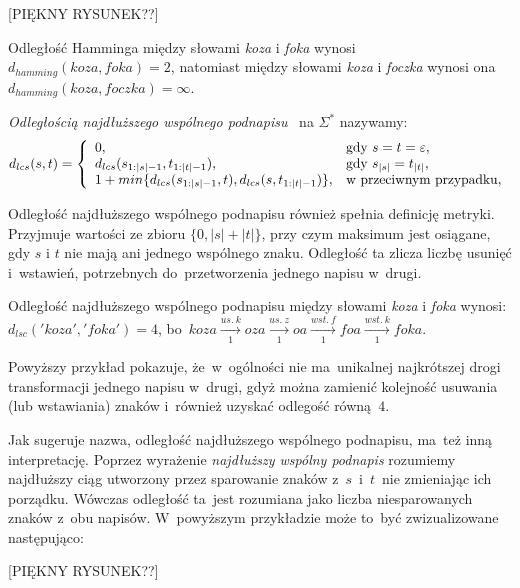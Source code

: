 \documentclass{praca1}
\begin{document}
[PIĘKNY RYSUNEK??]

\begin{example}
Odległość Hamminga między słowami \emph{koza} i \emph{foka} wynosi $d_{hamming}(koza, foka) = 2$, natomiast między słowami \emph{koza} i \emph{foczka} wynosi ona $d_{hamming}(koza, foczka) = \infty$.
\end{example}

\begin{definition}
\emph{Odległością najdłuższego wspólnego podnapisu}~\cite{Needleman2008:generalmethod} na $\Sigma^*$ nazywamy:
$$
d_{lcs}(s, t) = \left\{
\begin{array}{l l}     
    0, & \text{gdy } s = t = \varepsilon,\\
    d_{lcs}(s_{1:|s|-1}, t_{1:|t|-1}), & \text{gdy } s_{|s|} = t_{|t|}, \\
    1+min\{d_{lcs}(s_{1:|s|-1}, t), d_{lcs}(s, t_{1:|t|-1})\}, & \text{w przeciwnym przypadku},
\end{array}\right.
$$
\end{definition}

Odległość najdłuższego wspólnego podnapisu również spełnia definicję metryki. Przyjmuje wartości ze zbioru $\{0, |s|+|t|\}$, przy czym maksimum jest osiągane, gdy $s$ i $t$ nie mają ani jednego wspólnego znaku.
Odległość ta zlicza liczbę usunięć i~wstawień, potrzebnych do~przetworzenia jednego napisu w~drugi. 

\begin{example}
Odległość najdłuższego wspólnego podnapisu między słowami \emph{koza} i \emph{foka} wynosi: $d_{lsc}('koza', 'foka') = 4$, bo~$koza  \xrightarrow[1]{us.\ k} oza \xrightarrow[1]{us.\ z} oa  \xrightarrow[1]{wst.\ f} foa \xrightarrow[1]{wst.\ k} foka$.
\end{example}

Powyższy przykład pokazuje, że~w~ogólności nie ma~unikalnej najkrótszej drogi transformacji jednego napisu w~drugi, gdyż można zamienić kolejność usuwania (lub wstawiania) znaków i~również uzyskać odlegość równą~$4$.

Jak sugeruje nazwa, odległość najdłuższego wspólnego podnapisu, ma~też inną interpretację. Poprzez wyrażenie \emph{najdłuższy wspólny podnapis} rozumiemy najdłuższy ciąg utworzony przez sparowanie znaków z~$s$~i~$t$~nie zmieniając ich porządku. Wówczas odległość ta~jest rozumiana jako liczba niesparowanych znaków z~obu napisów. W~powyższym przykładzie może to~być zwizualizowane następująco:
	
[PIĘKNY RYSUNEK??]
\end{document}
